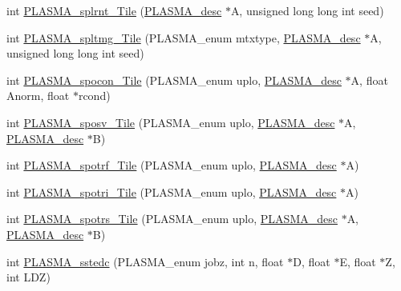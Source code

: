 \begin{DoxyCompactItemize}
\item 
int \hyperlink{group__float__Tile_ga8acae46eec2aa940148afebdaf3662c4_ga8acae46eec2aa940148afebdaf3662c4}{P\+L\+A\+S\+M\+A\+\_\+splrnt\+\_\+\+Tile} (\hyperlink{structplasma__desc__t}{P\+L\+A\+S\+M\+A\+\_\+desc} $\ast$A, unsigned long long int seed)
\item 
int \hyperlink{group__float__Tile_ga68fe8bd8a7f5edfc934d558ba34e3da4_ga68fe8bd8a7f5edfc934d558ba34e3da4}{P\+L\+A\+S\+M\+A\+\_\+spltmg\+\_\+\+Tile} (P\+L\+A\+S\+M\+A\+\_\+enum mtxtype, \hyperlink{structplasma__desc__t}{P\+L\+A\+S\+M\+A\+\_\+desc} $\ast$A, unsigned long long int seed)
\item 
int \hyperlink{group__float__Tile_ga77c4e9a5bcfacbb8cd5672f3ff30542e_ga77c4e9a5bcfacbb8cd5672f3ff30542e}{P\+L\+A\+S\+M\+A\+\_\+spocon\+\_\+\+Tile} (P\+L\+A\+S\+M\+A\+\_\+enum uplo, \hyperlink{structplasma__desc__t}{P\+L\+A\+S\+M\+A\+\_\+desc} $\ast$A, float Anorm, float $\ast$rcond)
\item 
int \hyperlink{group__float__Tile_ga161633108104c031c61b103b8645f029_ga161633108104c031c61b103b8645f029}{P\+L\+A\+S\+M\+A\+\_\+sposv\+\_\+\+Tile} (P\+L\+A\+S\+M\+A\+\_\+enum uplo, \hyperlink{structplasma__desc__t}{P\+L\+A\+S\+M\+A\+\_\+desc} $\ast$A, \hyperlink{structplasma__desc__t}{P\+L\+A\+S\+M\+A\+\_\+desc} $\ast$B)
\item 
int \hyperlink{group__float__Tile_ga0518a079c049cdcd32b8ae408e0d5e28_ga0518a079c049cdcd32b8ae408e0d5e28}{P\+L\+A\+S\+M\+A\+\_\+spotrf\+\_\+\+Tile} (P\+L\+A\+S\+M\+A\+\_\+enum uplo, \hyperlink{structplasma__desc__t}{P\+L\+A\+S\+M\+A\+\_\+desc} $\ast$A)
\item 
int \hyperlink{group__float__Tile_ga3f2b23232748f3fde3e58d06757af2ff_ga3f2b23232748f3fde3e58d06757af2ff}{P\+L\+A\+S\+M\+A\+\_\+spotri\+\_\+\+Tile} (P\+L\+A\+S\+M\+A\+\_\+enum uplo, \hyperlink{structplasma__desc__t}{P\+L\+A\+S\+M\+A\+\_\+desc} $\ast$A)
\item 
int \hyperlink{group__float__Tile_gaf5ba3c807c89d3363ea8cf648b11b40d_gaf5ba3c807c89d3363ea8cf648b11b40d}{P\+L\+A\+S\+M\+A\+\_\+spotrs\+\_\+\+Tile} (P\+L\+A\+S\+M\+A\+\_\+enum uplo, \hyperlink{structplasma__desc__t}{P\+L\+A\+S\+M\+A\+\_\+desc} $\ast$A, \hyperlink{structplasma__desc__t}{P\+L\+A\+S\+M\+A\+\_\+desc} $\ast$B)
\item 
int \hyperlink{group__float__Tile_gabd2ceaf8eca3bf6b47c652ad6bcc3598_gabd2ceaf8eca3bf6b47c652ad6bcc3598}{P\+L\+A\+S\+M\+A\+\_\+sstedc} (P\+L\+A\+S\+M\+A\+\_\+enum jobz, int n, float $\ast$D, float $\ast$E, float $\ast$Z, int L\+D\+Z)
\item 

\end{DoxyCompactItemize}
